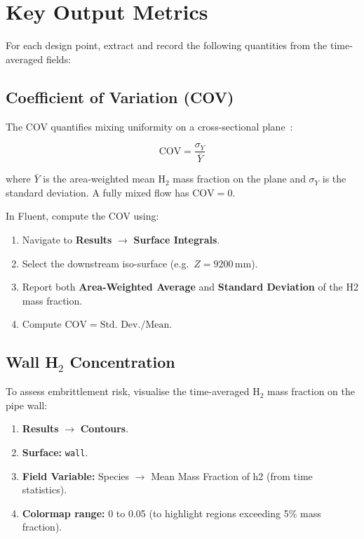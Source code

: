 \documentclass[12pt,a4paper]{report}
\begin{document}
\section{Key Output Metrics}

For each design point, extract and record the following quantities from
the time-averaged fields:

\subsection{Coefficient of Variation (COV)}

The COV quantifies mixing uniformity on a cross-sectional
plane~\cite{Kukukova2009}:

\begin{equation}
  \text{COV} = \frac{\sigma_Y}{\bar{Y}}
  \label{eq:COV}
\end{equation}

where $\bar{Y}$ is the area-weighted mean H$_2$ mass fraction on the
plane and $\sigma_Y$ is the standard deviation.
A fully mixed flow has $\text{COV} = 0$.

\noindent In Fluent, compute the COV using:
\begin{enumerate}
  \item Navigate to \textbf{Results} $\rightarrow$ \textbf{Surface
        Integrals}.
  \item Select the downstream iso-surface (e.g.\ $Z = 9200$\,mm).
  \item Report both \textbf{Area-Weighted Average} and
        \textbf{Standard Deviation} of the H2 mass fraction.
  \item Compute $\text{COV} = \text{Std.\ Dev.} / \text{Mean}$.
\end{enumerate}


\subsection[Wall H2 Concentration]{Wall H\texorpdfstring{$_2$}{2} Concentration}

To assess embrittlement risk, visualise the time-averaged H$_2$ mass
fraction on the pipe wall:

\begin{enumerate}
  \item \textbf{Results} $\rightarrow$ \textbf{Contours}.
  \item \textbf{Surface:} \texttt{wall}.
  \item \textbf{Field Variable:} Species $\rightarrow$ Mean Mass
        Fraction of h2 (from time statistics).
  \item \textbf{Colormap range:} 0 to 0.05 (to highlight regions
        exceeding 5\% mass fraction).
\end{enumerate}
\end{document}
